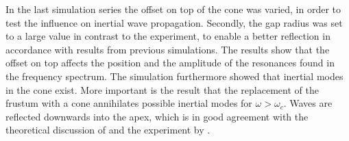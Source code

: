 In the last simulation series  the offset on top of the cone was varied, in order to test the influence on
inertial wave propagation. Secondly, the gap radius was set to a large value in contrast to the experiment,
to enable a better reflection in accordance with results from previous simulations.
The results  show that the offset on top affects the position and the amplitude of the resonances
found in the frequency spectrum.
The simulation furthermore showed that inertial modes in the cone exist.
More important is the result that the replacement of the frustum with a cone annihilates possible
inertial modes for $\omega > \omega_c$.
Waves are reflected downwards into the apex, which is in good agreement with the
theoretical discussion of \citep{Greenspan1969} and the experiment by \citep{Beardsley1970}.

